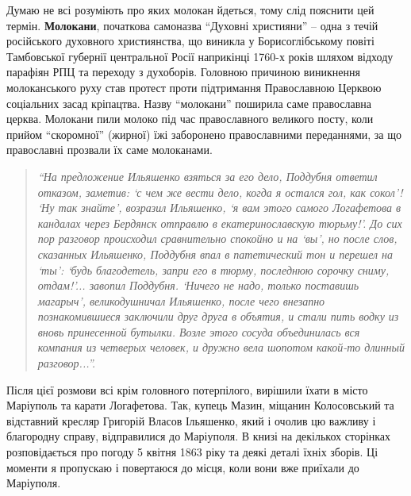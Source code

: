 
Думаю не всі розуміють про яких молокан йдеться, тому слід пояснити цей термін.
\textbf{Молокани}, початкова самоназва \enquote{Духовні християни} – одна з течій російського
духовного християнства, що виникла у Борисоглібському повіті Тамбовської
губернії центральної Росії наприкінці 1760-х років шляхом відходу парафіян РПЦ
та переходу з духоборів. Головною причиною виникнення молоканського руху став
протест проти підтримання Православною Церквою соціальних засад кріпацтва.
Назву \enquote{молокани} поширила саме православна церква. Молокани пили молоко під час
православного великого посту, коли прийом \enquote{скоромної} (жирної) їжі заборонено
православними переданнями, за що православні прозвали їх саме молоканами.

\begin{quote}
\em
\enquote{На предложение Ильяшенко взяться за его дело, Поддубня ответил отказом,
заметив: \enquote{с чем же вести дело, когда я остался гол, как сокол}! \enquote{Ну так
знайте}, возразил Ильяшенко, \enquote{я вам этого самого Логафетова в кандалах через
Бердянск отправлю в екатеринославскую тюрьму!}. До сих пор разговор происходил
сравнительно спокойно и на \enquote{вы}, но после слов, сказанных Ильяшенко, Поддубня
впал в патетический тон и перешел на \enquote{ты}: \enquote{будь благодетель, запри его в
тюрму, последнюю сорочку сниму, отдам!}... завопил Поддубня. \enquote{Ничего не надо,
только поставишь магарыч}, великодушничал Ильяшенко, после чего внезапно
познакомившиеся заключили друг друга в объятия, и стали пить водку из вновь
принесенной бутылки. Возле этого сосуда объединилась вся компания из четверых
человек, и дружно вела шопотом какой-то длинный разговор...}.
\end{quote}

Після цієї розмови всі крім головного потерпілого, вирішили їхати в місто
Маріуполь та карати Логафетова. Так, купець Мазин, міщанин Колосовський та
відставний кресляр Григорій Власов Ільяшенко, який і очолив цю важливу і
благородну справу, відправилися до Маріуполя. В книзі на декількох сторінках
розповідається про погоду 5 квітня 1863 ріку та деякі деталі їхніх зборів. Ці
моменти я пропускаю і повертаюся до місця, коли вони вже приїхали до Маріуполя.

